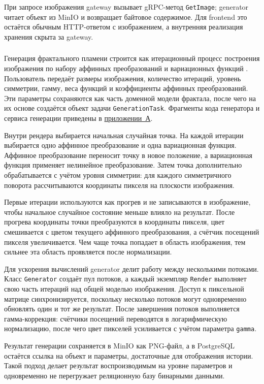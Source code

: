 При запросе изображения gateway вызывает gRPC-метод \texttt{GetImage}; generator читает объект из MinIO и возвращает байтовое содержимое. Для frontend это остаётся обычным HTTP-ответом с изображением, а внутренняя реализация хранения скрыта за gateway.

\subsubsection{}

Генерация фрактального пламени строится как итерационный процесс построения изображения по набору аффинных преобразований и вариационных функций \cite{fractalflame}. Пользователь передаёт размеры изображения, количество итераций, уровень симметрии, гамму, веса функций и коэффициенты аффинных преобразований. Эти параметры сохраняются как часть доменной модели фрактала, после чего на их основе создаётся объект задачи \texttt{GenerationTask}. Фрагменты кода генератора и сервиса генерации приведены в \hyperref[app:code]{приложении~А}.

Внутри рендера выбирается начальная случайная точка. На каждой итерации выбирается одно аффинное преобразование и одна вариационная функция. Аффинное преобразование переносит точку в новое положение, а вариационная функция применяет нелинейное преобразование. Затем точка дополнительно обрабатывается с учётом уровня симметрии: для каждого симметричного поворота рассчитываются координаты пикселя на плоскости изображения.

Первые итерации используются как прогрев и не записываются в изображение, чтобы начальное случайное состояние меньше влияло на результат. После прогрева координаты точки преобразуются в координаты пикселя, цвет смешивается с цветом текущего аффинного преобразования, а счётчик посещений пикселя увеличивается. Чем чаще точка попадает в область изображения, тем сильнее эта область проявляется после нормализации.

Для ускорения вычислений generator делит работу между несколькими потоками. Класс \texttt{Generator} создаёт пул потоков, а каждый экземпляр \texttt{Render} выполняет свою часть итераций над общей моделью изображения. Доступ к пиксельной матрице синхронизируется, поскольку несколько потоков могут одновременно обновлять один и тот же результат. После завершения потоков выполняется гамма-коррекция: счётчики посещений переводятся в логарифмическую нормализацию, после чего цвет пикселей усиливается с учётом параметра \texttt{gamma}.

Результат генерации сохраняется в MinIO как PNG-файл, а в PostgreSQL остаётся ссылка на объект и параметры, достаточные для отображения истории. Такой подход делает результат воспроизводимым на уровне параметров и одновременно не перегружает реляционную базу бинарными данными.

